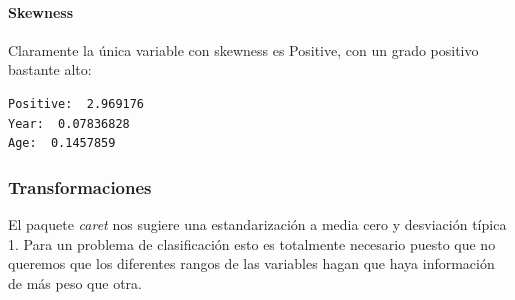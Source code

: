 









\paragraph{Skewness}
Claramente la única variable con skewness es Positive, con un grado positivo bastante alto:
\begin{verbatim}
Positive:  2.969176
Year:  0.07836828
Age:  0.1457859
\end{verbatim}

\subsubsection{Transformaciones}

El paquete \textit{caret} nos sugiere una estandarización a media cero y desviación típica 1. Para un problema de clasificación esto es totalmente necesario puesto que no queremos que los diferentes rangos de las variables hagan que haya información de más peso que otra.

\vspace{\baselineskip}

